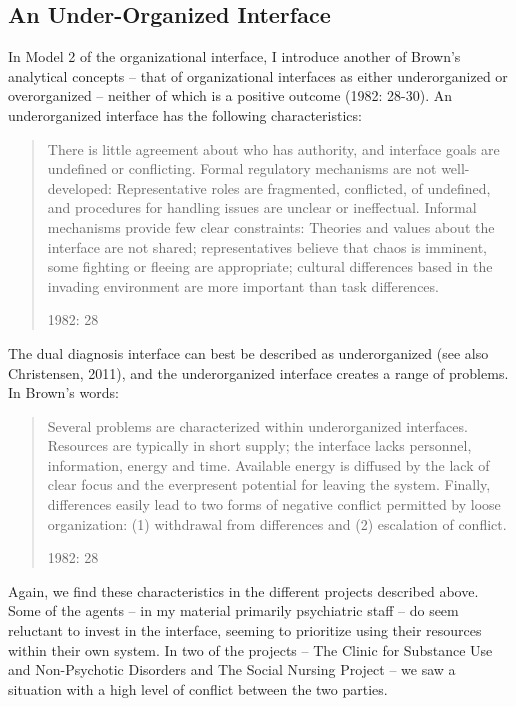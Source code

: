 \begin{multicols}{2}
\chapter{An Under-Organized Interface}
In Model 2 of the organizational interface, I introduce another of Brown’s analytical concepts – that of organizational interfaces as either underorganized or overorganized – neither of which is a positive outcome (1982: 28-30). An underorganized interface has the following characteristics:
    \blockquote[1982: 28]{There is little agreement about who has authority, and interface goals are undefined or conflicting. Formal regulatory mechanisms are not well-developed: Representative roles are fragmented, conflicted, of undefined, and procedures for handling issues are unclear or ineffectual. Informal mechanisms provide few clear constraints: Theories and values about the interface are not shared; representatives believe that chaos is imminent, some fighting or fleeing are appropriate; cultural differences based in the invading environment are more important than task differences.}
The dual diagnosis interface can best be described as underorganized (see also Christensen, 2011), and the underorganized interface creates a range of problems. In Brown’s words: 
    \blockquote[1982: 28]{Several problems are characterized within underorganized interfaces. Resources are typically in short supply; the interface lacks personnel, information, energy and time. Available energy is diffused by the lack of clear focus and the everpresent potential for leaving the system. Finally, differences easily lead to two forms of negative conflict permitted by loose organization: (1) withdrawal from differences and (2) escalation of conflict.}
Again, we find these characteristics in the different projects described above. Some of the agents – in my material primarily psychiatric staff – do seem reluctant to invest in the interface, seeming to prioritize using their resources within their own system. In two of the projects – The Clinic for Substance Use and Non-Psychotic Disorders and The Social Nursing Project – we saw a situation with a high level of conflict between the two parties.
\par

\end{multicols}
